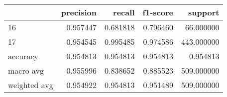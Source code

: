 \begin{tabular}{lrrrr}
\toprule
 & precision & recall & f1-score & support \\
\midrule
16 & 0.957447 & 0.681818 & 0.796460 & 66.000000 \\
17 & 0.954545 & 0.995485 & 0.974586 & 443.000000 \\
accuracy & 0.954813 & 0.954813 & 0.954813 & 0.954813 \\
macro avg & 0.955996 & 0.838652 & 0.885523 & 509.000000 \\
weighted avg & 0.954922 & 0.954813 & 0.951489 & 509.000000 \\
\bottomrule
\end{tabular}
